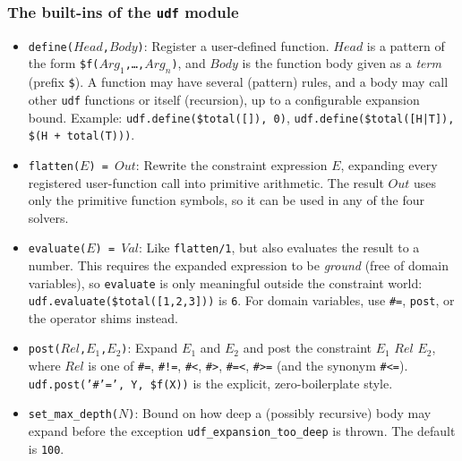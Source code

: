 \subsubsection{The built-ins of the \texttt{udf} module}

\begin{itemize}

\item \texttt{define($Head$,$Body$)}: Register a user-defined function.
      $Head$ is a pattern of the form \texttt{\$f($Arg_1$,\ldots,$Arg_n$)},
      and $Body$ is the function body given as a \emph{term} (prefix
      \texttt{\$}).  A function may have several (pattern) rules, and a body
      may call other \texttt{udf} functions or itself (recursion), up to a
      configurable expansion bound.  Example:
      \texttt{udf.define(\$total([]), 0)},
      \texttt{udf.define(\$total([H|T]), \$(H + total(T)))}.

\item \texttt{flatten($E$) = $Out$}: Rewrite the constraint expression $E$,
      expanding every registered user-function call into primitive
      arithmetic.  The result $Out$ uses only the primitive function symbols,
      so it can be used in any of the four solvers.

\item \texttt{evaluate($E$) = $Val$}: Like \texttt{flatten/1}, but also
      evaluates the result to a number.  This requires the expanded
      expression to be \emph{ground} (free of domain variables), so
      \texttt{evaluate} is only meaningful outside the constraint world:
      \texttt{udf.evaluate(\$total([1,2,3]))} is \texttt{6}.  For
      domain variables, use \texttt{\#=}, \texttt{post}, or the operator
      shims instead.

\item \texttt{post($Rel$,$E_1$,$E_2$)}: Expand $E_1$ and $E_2$ and
      post the constraint $E_1$ $Rel$ $E_2$, where $Rel$ is one of
      \verb+#=+, \verb+#!=+, \verb+#<+, \verb+#>+, \verb+#=<+,
      \verb+#>=+ (and the synonym \verb+#<=+).
      \texttt{udf.post('\#'=', Y, \$f(X))} is the explicit,
      zero-boilerplate style.

\item \texttt{set\_max\_depth($N$)}: Bound on how deep a (possibly
      recursive) body may expand before the exception
      \texttt{udf\_expansion\_too\_deep} is thrown.
      The default is \texttt{100}.

\end{itemize}

